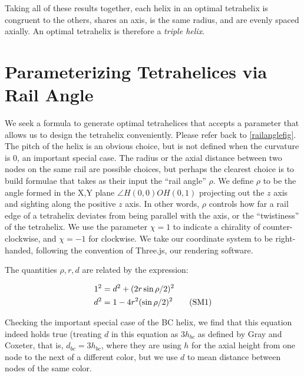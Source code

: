 \documentclass[review]{siamonline1116}
\newcommand\numberthis{\addtocounter{equation}{1}\tag{\theequation}}
\begin{document}
Taking all of these results together, 
each helix in an optimal tetrahelix is congruent to the others, shares an axis, is the same radius, and are evenly spaced
axially.
An optimal tetrahelix is therefore a \emph{triple helix}.

\section{Parameterizing Tetrahelices via Rail Angle}
\label{sec:parameterizing}

We seek a formula to generate optimal tetrahelices that accepts a
parameter that allows us to design the tetrahelix conveniently.
Please refer back to \cref{railanglefig}.
The pitch of the helix is an obvious choice, but is not defined when the
curvature is $0$, an important special case. The radius or the axial
distance between two nodes on the same rail are possible choices, but
perhaps the clearest choice is to build formulae that takes as their
input the ``rail angle'' $\rho$. We define $\rho$ to be the angle
formed in the X,Y plane $\angle H(0,0) O H(0,1)$ projecting out the $z$
axis and sighting along the positive $z$ axis. In other words, $\rho$
controls how far a rail edge of a tetrahelix deviates from being
parallel with the axis, or the ``twistiness'' of the tetrahelix. We use
the parameter $\chi = 1$ to indicate a chirality of counter-clockwise,
and $\chi = -1$ for clockwise. We take our coordinate system to be right-handed,
following the convention of Three.js, our rendering software.

The quantities $\rho,r,d$ are related by the expression:

\begin{align*}
  1^2 &= d^2 + (2 r \sin{ \rho / 2})^2 \\
  d^2 &= 1 - 4 r^2 (\sin{ \rho / 2})^2    \numberthis  \label{railangle} \\
\end{align*}

Checking the important special case of the BC helix, we find that this equation
indeed holds true (treating $d$ in this equation as $3 h_{bc}$ as defined by
Gray and Coxeter, that is, $d_{bc} = 3h_{bc}$, where they are using
$h$ for the axial height from one node to
the next of a different color, but we use $d$ to mean distance between nodes of
the  same color.
\end{document}
